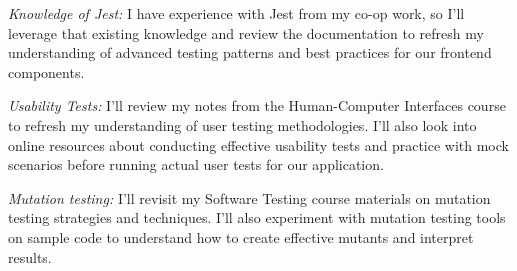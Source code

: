 \documentclass[12pt, titlepage]{article}
\begin{document}
\begin{enumerate}
  \textit{Knowledge of Jest:} I have experience with Jest from my co-op work, so I'll leverage that existing knowledge and review the documentation to refresh my understanding of advanced testing patterns and best practices for our frontend components.
  
  \textit{Usability Tests:} I'll review my notes from the Human-Computer Interfaces course to refresh my understanding of user testing methodologies. I'll also look into online resources about conducting effective usability tests and practice with mock scenarios before running actual user tests for our application.
  
  \textit{Mutation testing:} I'll revisit my Software Testing course materials on mutation testing strategies and techniques. I'll also experiment with mutation testing tools on sample code to understand how to create effective mutants and interpret results.
  

\end{enumerate}
\end{document}
